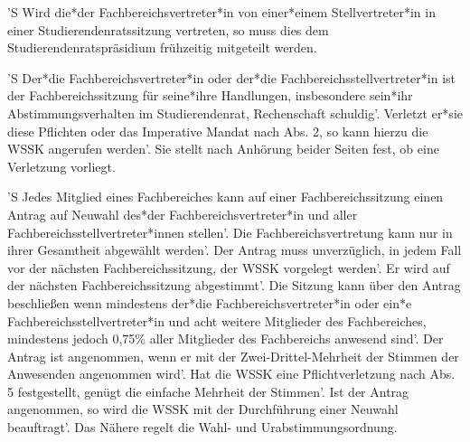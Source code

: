 \documentclass[fontsize=12pt,parskip=half]{scrartcl}
\begin{document}
\begin{contract}
  'S Wird die*der Fachbereichsvertreter*in von einer*einem Stellvertreter*in in
  einer Studierendenratssitzung vertreten, so muss dies dem
  Studierendenratspräsidium frühzeitig mitgeteilt werden.

  'S Der*die Fachbereichsvertreter*in oder der*die Fachbereichsstellvertreter*in
  ist der Fachbereichssitzung für seine*ihre Handlungen, insbesondere sein*ihr
  Abstimmungsverhalten im Studierendenrat, Rechenschaft schuldig'. Verletzt
  er*sie diese Pflichten oder das Imperative Mandat nach Abs. 2, so kann hierzu
  die WSSK angerufen werden'. Sie stellt nach Anhörung beider Seiten fest, ob
  eine Verletzung vorliegt.

  'S Jedes Mitglied eines Fachbereiches kann auf einer Fachbereichssitzung einen
  Antrag auf Neuwahl des*der Fachbereichsvertreter*in und aller
  Fachbereichsstellvertreter*innen stellen'. Die Fachbereichsvertretung kann nur
  in ihrer Gesamtheit abgewählt werden'. Der Antrag muss unverzüglich, in jedem
  Fall vor der nächsten Fachbereichssitzung, der WSSK vorgelegt werden'. Er wird
  auf der nächsten Fachbereichssitzung abgestimmt'. Die Sitzung kann über den
  Antrag beschließen wenn mindestens der*die Fachbereichsvertreter*in oder ein*e
  Fachbereichsstellvertreter*in und acht weitere Mitglieder des Fachbereiches,
  mindestens jedoch 0,75\% aller Mitglieder des Fachbereichs anwesend sind'. Der
  Antrag ist angenommen, wenn er mit der Zwei-Drittel-Mehrheit der Stimmen der
  Anwesenden angenommen wird'. Hat die WSSK eine Pflichtverletzung nach Abs. 5
  festgestellt, genügt die einfache Mehrheit der Stimmen'. Ist der Antrag
  angenommen, so wird die WSSK mit der Durchführung einer Neuwahl beauftragt'.
  Das Nähere regelt die Wahl- und Urabstimmungsordnung.

\end{contract}
\end{document}
